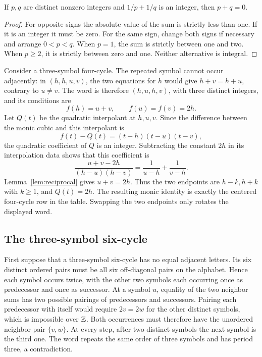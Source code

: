 \begin{lemma}
\label{lem:reciprocal}
If $p,q$ are distinct nonzero integers and $1/p+1/q$ is an
integer, then $p+q=0$.
\end{lemma}
\begin{proof}
For opposite signs the absolute value of the sum is strictly less
than one. If it is an integer it must be zero.
For the same sign, change both signs if necessary and arrange
$0<p<q$. When $p=1$, the sum is strictly between one and two.
When $p\ge2$, it is strictly between zero and one.
Neither alternative is integral.
\end{proof}

Consider a three-symbol four-cycle. The repeated symbol cannot occur
adjacently: in $(h,h,u,v)$, the two equations for $h$ would give
$h+v=h+u$, contrary to $u\ne v$. The word is therefore
$(h,u,h,v)$, with three distinct integers, and its conditions are
\[
 f(h)=u+v,\qquad f(u)=f(v)=2h.
\]
Let $Q(t)$ be the quadratic interpolant at $h,u,v$.
Since the difference between the monic cubic and this interpolant is
\[
 f(t)-Q(t)=(t-h)(t-u)(t-v),
\]
the quadratic coefficient of $Q$ is an integer. Subtracting the
constant $2h$ in its interpolation data shows that this coefficient is
\[
 \frac{u+v-2h}{(h-u)(h-v)}
 =\frac{1}{u-h}+\frac{1}{v-h}.
\]
Lemma~\ref{lem:reciprocal} gives $u+v=2h$. Thus the two endpoints
are $h-k,h+k$ with $k\ge1$, and $Q(t)=2h$. The resulting monic
identity is exactly the centered four-cycle row in the table.
Swapping the two endpoints only rotates the displayed word.

\subsection{The three-symbol six-cycle}

First suppose that a three-symbol six-cycle has no equal adjacent
letters. Its six distinct ordered pairs must be all six off-diagonal
pairs on the alphabet. Hence each symbol occurs twice, with the other
two symbols each occurring once as predecessor and once as successor.
At a symbol $u$, equality of the two neighbor sums has two possible
pairings of predecessors and successors. Pairing each predecessor
with itself would require $2v=2w$ for the other distinct symbols,
which is impossible over $\mathbb{Z}$. Both occurrences must therefore
have the unordered neighbor pair $\{v,w\}$. At every step, after
two distinct symbols the next symbol is the third one. The word
repeats the same order of three symbols and has period three,
a contradiction.

